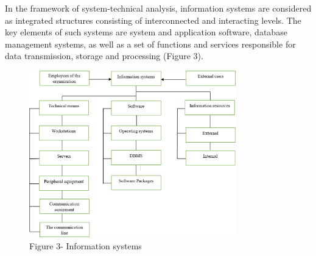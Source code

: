 \begin{multicols}{2}
In the framework of system-technical analysis, information systems are
considered as integrated structures consisting of interconnected and
interacting levels. The key elements of such systems are system and
application software, database management systems, as well as a set of
functions and services responsible for data transmission, storage and
processing (Figure 3).
\end{multicols}

\begin{figure}[H]
	\centering
	\includegraphics[width=0.8\textwidth]{assets/45}
	\caption*{Figure 3- Information systems}
\end{figure}

